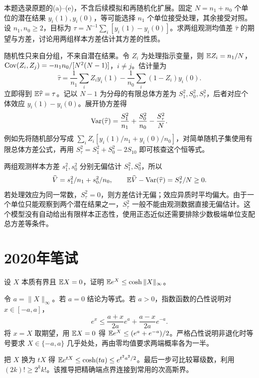 \begin{example}[原题4(a)--(e)：完全随机分组的有限总体推断]\label{yau:2019-4}
本题选录原题的(a)--(e)，不含后续模拟和再随机化扩展。固定 $N=n_1+n_0$ 个单位的潜在结果 $y_i(1),y_i(0)$，等可能选择 $n_1$ 个单位接受处理，其余接受对照。设 $n_1,n_0\ge2$，目标为 $\tau=N^{-1}\sum_i[y_i(1)-y_i(0)]$。求两组观测均值差 $\widehat\tau$ 的期望与方差，讨论用两组样本方差估计其方差的性质。
\end{example}
\begin{solve}
随机性只来自分组，不来自潜在结果。令 $Z_i$ 为处理指示变量，则 $\mathbb E Z_i=n_1/N$，$\operatorname{Cov}(Z_i,Z_j)=-n_1n_0/[N^2(N-1)]$，$i\ne j$。估计量为
\[
\widehat\tau=\frac1{n_1}\sum_iZ_iy_i(1)-\frac1{n_0}\sum_i(1-Z_i)y_i(0).
\]
立即得到 $\mathbb E\widehat\tau=\tau$。记以 $N-1$ 为分母的有限总体方差为 $S_1^2,S_0^2,S_\tau^2$，后者对应个体效应 $y_i(1)-y_i(0)$。展开协方差得
\[
\operatorname{Var}(\widehat\tau)=\frac{S_1^2}{n_1}+\frac{S_0^2}{n_0}-\frac{S_\tau^2}{N}.
\]
例如先将随机部分写成 $\sum_iZ_i[y_i(1)/n_1+y_i(0)/n_0]$，对简单随机子集使用有限总体方差公式，再用 $S_\tau^2=S_1^2+S_0^2-2S_{10}$ 即可核查这个恒等式。

两组观测样本方差 $s_1^2,s_0^2$ 分别无偏估计 $S_1^2,S_0^2$，所以
\[
\widehat V=s_1^2/n_1+s_0^2/n_0,\qquad \mathbb E\widehat V-\operatorname{Var}(\widehat\tau)=S_\tau^2/N\ge0.
\]
若处理效应为同一常数，$S_\tau^2=0$，则方差估计无偏；效应异质时平均偏大。由于一个单位只能观察到两个潜在结果之一，$S_\tau^2$ 一般不能由观测数据直接无偏估计。这个模型没有自动给出有限样本正态性，使用正态近似还需要排除少数极端单位支配总方差等条件。
\end{solve}

\section{2020年笔试}
\begin{example}[原题1：有界零均值变量的指数矩]\label{yau:2020-1}
设 $X$ 本质有界且 $\mathbb E X=0$，证明 $\mathbb E e^X\le\cosh\|X\|_\infty$。
\end{example}
\begin{solve}
令 $a=\|X\|_\infty$。若 $a=0$ 结论为等式。若 $a>0$，指数函数的凸性说明对 $x\in[-a,a]$，
\[
e^x\le\frac{a+x}{2a}e^a+\frac{a-x}{2a}e^{-a}.
\]
将 $x=X$ 取期望，用 $\mathbb E X=0$ 得 $\mathbb E e^X\le(e^a+e^{-a})/2$。严格凸性说明非退化时等号要求 $X\in\{-a,a\}$ 几乎处处，再由零均值要求两端概率各为一半。

把 $X$ 换为 $tX$ 得 $\mathbb E e^{tX}\le\cosh(ta)\le e^{t^2a^2/2}$。最后一步可比较幂级数，利用 $(2k)!\ge2^kk!$。该推导把精确端点界连接到常用的次高斯界。
\end{solve}

